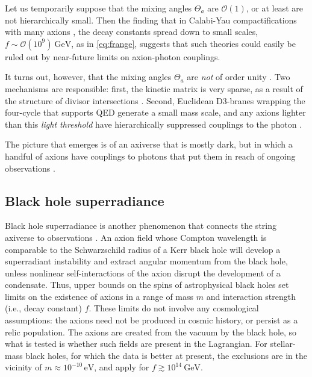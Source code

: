 \documentclass[12pt,a4wide]{article}
\begin{document}
Let us temporarily suppose that the mixing angles $\Theta_a$ are $\mathcal{O}(1)$, or at least are not hierarchically small.  Then the finding that 
in Calabi-Yau compactifications with many axions \cite{Demirtas:2018akl,Mehta:2021pwf},
the decay constants spread down to small scales, $f \sim \mathcal{O}(10^9)~\text{GeV}$, as in \eqref{eq:frange}, suggests that such theories could easily be ruled out by near-future limits on axion-photon couplings.

It turns out, however, that the mixing angles $\Theta_a$ are \emph{not} of order unity \cite{Halverson:2019cmy,Gendler:2023kjt}.
Two mechanisms are responsible: first, the kinetic matrix is very sparse, as a result of the structure of divisor intersections \cite{Halverson:2019cmy}.  Second, Euclidean D3-branes wrapping the four-cycle that supports QED generate a small mass scale, and any axions lighter than this \emph{light threshold} have hierarchically suppressed couplings to the photon \cite{Gendler:2023kjt}.

The picture that emerges is of an axiverse that is mostly dark, but in which a handful of axions have couplings to photons that put them in reach of ongoing observations \cite{Marsh:2015xka,Irastorza:2018dyq,Adams:2022pbo,Rogers:2023ezo}.
 
 
\subsection{Black hole superradiance}

Black hole superradiance is another phenomenon that connects the string axiverse to observations \cite{Arvanitaki:2010sy,Brito:2015oca}.
An axion field whose Compton wavelength is comparable to the Schwarzschild radius of a Kerr black hole will develop a superradiant instability and extract angular momentum from the black hole, unless nonlinear self-interactions of the axion disrupt the development of a condensate.  Thus, upper bounds on the spins of astrophysical black holes set limits on the existence of axions in a range of mass $m$ and interaction strength (i.e., decay constant) $f$.  These limits do not involve any cosmological assumptions: the axions need not be produced in cosmic history, or persist as a relic population. The axions are created from the vacuum by the black hole, so what is tested is whether such fields are present in the Lagrangian.
For stellar-mass black holes, for which the data is better at present, the exclusions are in the vicinity of $m \approx 10^{-10}\,\text{eV}$, and apply for $f \gtrsim 10^{14}~\text{GeV}$.
\end{document}
